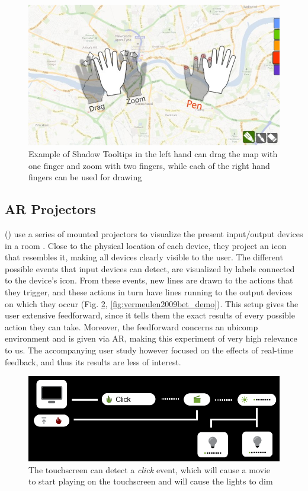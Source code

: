 \documentclass[a4paper,fancychapters]{article}
\begin{document}
	\begin{figure}
		\centering
		\includegraphics[width=0.7\linewidth]{img/freitag2012enhanced/demo.png}
		\caption{Example of Shadow Tooltips in the left hand can drag the map with one finger and zoom with two fingers, while each of the right hand fingers can be used for drawing \cite{freitag2012enhanced}}
		\label{fig:freitag2012enhanced_demo}
	\end{figure}

	\subsection{AR Projectors} \label{subsec:ar_projectors}
	\citeauthor{vermeulen2009bet} (\citeyear{vermeulen2009bet}) use a series of mounted projectors to visualize the present input/output devices in a room \cite{vermeulen2009bet}. Close to the physical location of each device, they project an icon that resembles it, making all devices clearly visible to the user. The different possible events that input devices can detect, are visualized by labels connected to the device's icon. From these events, new lines are drawn to the actions that they trigger, and these actions in turn have lines running to the output devices on which they occur (Fig. \ref{fig:vermeulen2009bet_mockup}, \ref{fig:vermeulen2009bet_demo}). This setup gives the user extensive feedforward, since it tells them the exact results of every possible action they can take. Moreover, the feedforward concerns an ubicomp environment and is given via AR, making this experiment of very high relevance to us. The accompanying user study however focused on the effects of real-time feedback, and thus its results are less of interest.
	
	\begin{figure}
		\centering
		\includegraphics[width=0.7\linewidth]{img/vermeulen2009bet/mockup.png}
		\caption{The touchscreen can detect a \textit{click} event, which will cause a movie to start playing on the touchscreen and will cause the lights to dim \cite{vermeulen2009bet}}
		\label{fig:vermeulen2009bet_mockup}
	\end{figure}
	
\end{document}
